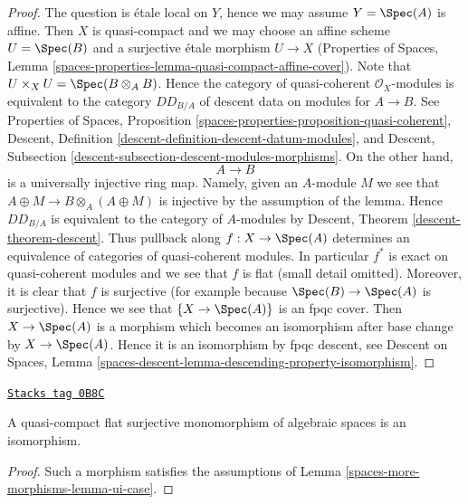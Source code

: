 \begin{proof}
The question is \'etale local on $Y$, hence we may assume $Y = \Spec(A)$
is affine. Then $X$ is quasi-compact and we may choose an affine scheme
$U = \Spec(B)$ and a surjective \'etale morphism $U \to X$
(Properties of Spaces, Lemma
\ref{spaces-properties-lemma-quasi-compact-affine-cover}).
Note that $U \times_X U = \Spec(B \otimes_A B)$. Hence the category of
quasi-coherent $\mathcal{O}_X$-modules is equivalent to the
category $DD_{B/A}$ of descent data on modules for $A \to B$.
See Properties of Spaces, Proposition
\ref{spaces-properties-proposition-quasi-coherent},
Descent, Definition \ref{descent-definition-descent-datum-modules}, and
Descent, Subsection \ref{descent-subsection-descent-modules-morphisms}.
On the other hand,
$$
A \to B
$$
is a universally injective ring map. Namely, given an
$A$-module $M$ we see that $A \oplus M \to B \otimes_A (A \oplus M)$
is injective by the assumption of the lemma. Hence
$DD_{B/A}$ is equivalent to the category of $A$-modules by
Descent, Theorem \ref{descent-theorem-descent}. Thus pullback along
$f : X \to \Spec(A)$ determines an equivalence of categories of
quasi-coherent modules. In particular $f^*$ is exact on
quasi-coherent modules and we see that $f$ is flat
(small detail omitted). Moreover, it is clear that $f$ is surjective
(for example because $\Spec(B) \to \Spec(A)$ is surjective).
Hence we see that $\{X \to \Spec(A)\}$ is an fpqc cover.
Then $X \to \Spec(A)$ is a morphism which becomes an isomorphism
after base change by $X \to \Spec(A)$. Hence it is an isomorphism by
fpqc descent, see Descent on Spaces, Lemma
\ref{spaces-descent-lemma-descending-property-isomorphism}.
\end{proof}

\begin{lemma}
\label{spaces-more-morphisms-lemma-flat-surjective-monomorphism}
\href{https://stacks.math.columbia.edu/tag/0B8C}{\texttt{Stacks tag 0B8C}}

A quasi-compact flat surjective monomorphism of algebraic spaces
is an isomorphism.
\end{lemma}

\begin{proof}
Such a morphism satisfies the assumptions of Lemma \ref{spaces-more-morphisms-lemma-ui-case}.
\end{proof}

